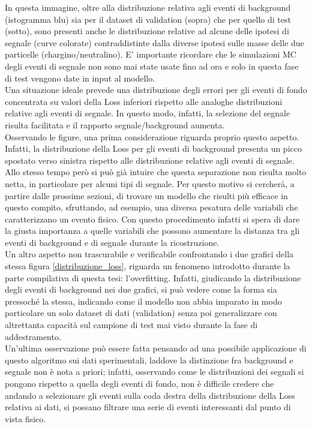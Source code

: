 In questa immagine, oltre alla distribuzione relativa agli eventi di background (istogramma blu) sia per il dataset di validation (sopra) che per quello di test (sotto), sono presenti anche le distribuzione relative ad alcune delle ipotesi di segnale (curve colorate) contraddistinte dalla diverse ipotesi sulle masse delle due particelle (chargino/neutralino). E' importante ricordare che le simulazioni MC degli eventi di segnale non sono mai state usate fino ad ora e solo in questa fase di test vengono date in input al modello. \\
Una situazione ideale prevede una distribuzione degli errori per gli eventi di fondo concentrata su valori della Loss inferiori rispetto alle analoghe distribuzioni relative agli eventi di segnale. In questo modo, infatti, la selezione del segnale risulta facilitata e il rapporto segnale/background aumenta.\\
Osservando le figure, una prima considerazione riguarda proprio questo aspetto. Infatti, la distribuzione della Loss per gli eventi di background presenta un picco spostato verso sinistra rispetto alle distribuzione relative agli eventi di segnale. Allo stesso tempo però si può già intuire che questa separazione non risulta molto netta, in particolare per alcuni tipi di segnale. Per questo motivo si cercherà, a partire dalle prossime sezioni, di trovare un modello che risulti più efficace in questo compito, sfruttando, ad esempio, una diversa pesatura delle variabili che caratterizzano un evento fisico. Con questo procedimento infatti si spera di dare la giusta importanza a quelle variabili che possono aumentare la distanza tra gli eventi di background e di segnale durante la ricostruzione.\\
Un altro aspetto non trascurabile e verificabile confrontando i due grafici della stessa figura \ref{distribuzione_loss}, riguarda un fenomeno introdotto durante la parte compilativa di questa tesi: l'overfitting. Infatti, giudicando la distribuzione degli eventi di background nei due grafici, si può vedere come la forma sia pressoché la stessa, indicando come il modello non abbia imparato in modo particolare un solo dataset di dati (validation) senza poi generalizzare con altrettanta capacità sul campione di test mai visto durante la fase di addestramento.\\
Un'ultima osservazione può essere fatta pensando ad una possibile applicazione di questo algoritmo sui dati sperimentali, laddove la distinzione fra background e segnale non è nota a priori; infatti, osservando come le distribuzioni dei segnali si pongono rispetto a quella degli eventi di fondo, non è difficile credere che andando a selezionare gli eventi sulla coda destra della distribuzione della Loss relativa ai dati, si possano filtrare una serie di eventi interessanti dal punto di vista fisico.

